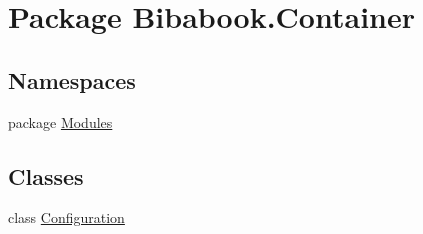 \hypertarget{namespace_bibabook_1_1_container}{}\section{Package Bibabook.\+Container}
\label{namespace_bibabook_1_1_container}
\subsection*{Namespaces}
\begin{DoxyCompactItemize}
\item 
package \hyperlink{namespace_bibabook_1_1_container_1_1_modules}{Modules}
\end{DoxyCompactItemize}
\subsection*{Classes}
\begin{DoxyCompactItemize}
\item 
class \hyperlink{class_bibabook_1_1_container_1_1_configuration}{Configuration}
\end{DoxyCompactItemize}
